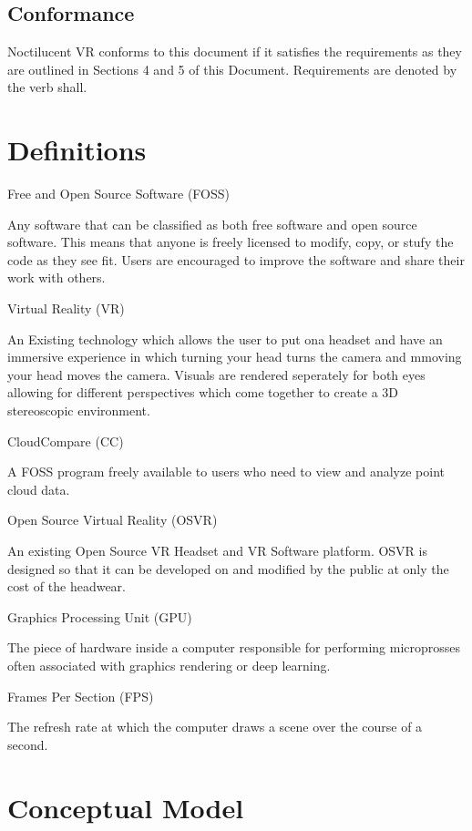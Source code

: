 \documentclass{article}
\begin{document}
\subsection{Conformance}

Noctilucent VR conforms to this document if it satisfies the requirements as they are outlined in Sections 4 and 5 of this Document. Requirements are denoted by the verb shall.

\section{Definitions}

Free and Open Source Software (FOSS)

Any software that can be classified as both free software and open source software.
This means that anyone is freely licensed to modify, copy, or stufy the code as they see fit.
Users are encouraged to improve the software and share their work with others.

Virtual Reality (VR)

An Existing technology which allows the user to put ona headset and have an immersive experience in which turning your  head turns the camera and mmoving your head moves the camera.
Visuals are rendered seperately for both eyes allowing for different perspectives which come together to create a 3D stereoscopic environment.

CloudCompare (CC)

A FOSS program freely available to users who need to view and analyze point cloud data.

Open Source Virtual Reality (OSVR)

An existing Open Source VR Headset and VR Software platform.
OSVR is designed so that it can be developed on and modified by the public at only the cost of the headwear.

Graphics Processing Unit (GPU)

The piece of hardware inside a computer responsible for performing microprosses often associated with graphics rendering or deep learning.

Frames Per Section (FPS)

The refresh rate at which the computer draws a scene over the course of a second.

\section{Conceptual Model}
\end{document}
